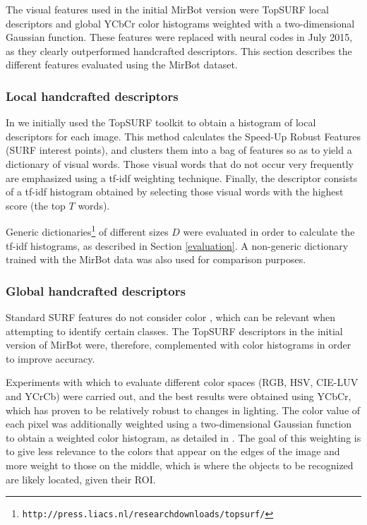\documentclass[final, twocolumn]{elsarticle}
\begin{document}
The visual features used in the initial MirBot version \cite{MirBot:System} were TopSURF local descriptors \citep{Thomee2010TOP-SURF:Toolkit} and global YCbCr color histograms weighted with a two-dimensional Gaussian function. These features were replaced with neural codes in July 2015, as they clearly outperformed handcrafted descriptors. This section describes the different features evaluated using the MirBot dataset.


\subsubsection{Local handcrafted descriptors}

In \cite{MirBot:System} we initially used the TopSURF \citep{Thomee2010TOP-SURF:Toolkit} toolkit to obtain a histogram of local descriptors for each image. This method calculates the Speed-Up Robust Features (SURF \citep{Bay2008Speeded-UpSURF} interest points), and clusters them \citep{Philbin2007ObjectMatching} into a bag of features so as to yield a dictionary of visual words. Those visual words that do not occur very frequently are emphasized using a tf-idf \citep{Salton1983IntroductionRetrieval.} weighting technique. Finally, the descriptor consists of a tf-idf histogram obtained by selecting those visual words with the highest score (the top $T$ words).

Generic dictionaries\footnote{\texttt{http://press.liacs.nl/researchdownloads/topsurf/}} of different sizes $D$ were evaluated in order to calculate the tf-idf histograms, as described in Section \ref{evaluation}. A non-generic dictionary trained with the MirBot data was also used for comparison purposes.


\subsubsection{Global handcrafted descriptors}

Standard SURF features do not consider color \cite{Jeong2001Histogram-BasedRetrieval}, which can be relevant when attempting to identify certain classes. The TopSURF descriptors in the initial version of MirBot \cite{MirBot:System} were, therefore, complemented with color histograms in order to improve accuracy.

Experiments with which to evaluate different color spaces (RGB, HSV, CIE-LUV and YCrCb) were carried out, and the best results were obtained using YCbCr, which has proven to be relatively robust to changes in lighting. The color value of each pixel was additionally weighted using a two-dimensional Gaussian function to obtain a weighted color histogram, as detailed in \cite{MirBot:System}. The goal of this weighting is to give less relevance to the colors that appear on the edges of the image and more weight to those on the middle, which is where the objects to be recognized are likely located, given their ROI.
\end{document}
